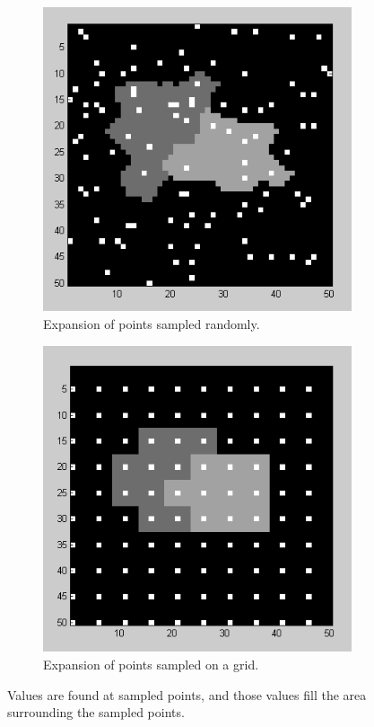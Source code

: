 \documentclass[english]{article}\usepackage[]{graphicx}\usepackage[]{color}
\begin{document}
\begin{figure}
\centering
\begin{subfigure}{.5\textwidth}
  \centering
    \includegraphics[width=.9\linewidth]{figures/randompointexpansion}
  \caption{Expansion of points sampled randomly.}
  \label{fig:randexp}
\end{subfigure}%
\begin{subfigure}{.5\textwidth}
  \centering
    \includegraphics[width=.9\linewidth]{figures/gridpointexpansion}
  \caption{Expansion of points sampled on a grid.}
  \label{fig:gridexp}
\end{subfigure}
\caption{Values are found at sampled points, and those values fill the area surrounding the sampled points.}
\label{fig:sampleexp}
\end{figure}
\end{document}
